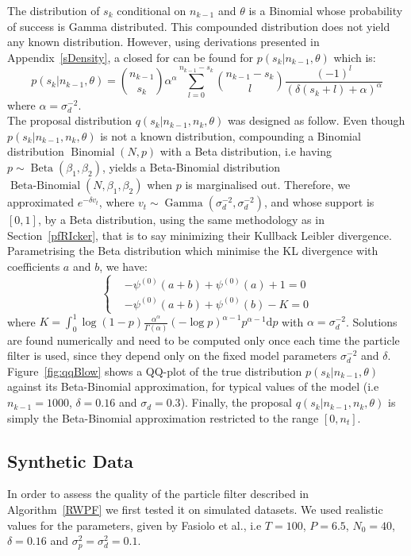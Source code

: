 \documentclass[12pt]{article}
\begin{document}
	The distribution of $s_k$ conditional on $n_{k-1}$ and $\theta$ is a Binomial whose probability of success is Gamma distributed. This compounded distribution does not yield any known distribution. However, using derivations presented in Appendix~\ref{sDensity}, a closed for can be found for $p(s_k|n_{k-1}, \theta)$ which is:
	\begin{equation*}
	p(s_k|n_{k-1}, \theta) = \binom{n_{k-1}}{s_k}\alpha^\alpha\sum_{l=0}^{n_{k-1}-s_k}\binom{n_{k-1}-s_k}{l}\frac{(-1)^l}{(\delta(s_k+l)+\alpha)^\alpha}
	\end{equation*}
	where $\alpha = \sigma_d^{-2}$. \\
	
	The proposal distribution $q(s_k|n_{k-1}, n_k, \theta)$ was designed as follow. Even though $p(s_k|n_{k-1}, n_k, \theta)$ is not a known distribution, compounding a Binomial distribution $\operatorname{Binomial}(N, p)$ with a Beta distribution, i.e having $p \sim \operatorname{Beta}(\beta_1,  \beta_2)$, yields a Beta-Binomial distribution $\operatorname{Beta-Binomial}(N, \beta_1, \beta_2)$ when $p$ is marginalised out. Therefore, we approximated $e^{-\delta v_t}$, where $v_t \sim \operatorname{Gamma}(\sigma_d^{-2}, \sigma_d^{-2})$, and whose support is $[0, 1]$, by a Beta distribution, using the same methodology as in Section~\ref{pfRIcker}, that is to say minimizing their Kullback Leibler divergence. Parametrising the Beta distribution which minimise the KL divergence with coefficients $a$ and $b$, we have:
	\[	\begin{cases}
	& -\psi^{(0)}(a+b) + \psi^{(0)}(a) + 1 = 0 \\
	& -\psi^{(0)}(a+b) + \psi^{(0)}(b) - K  = 0
	\end{cases}\]
	where $K=\int_{0}^{1}\log(1-p)\frac{\alpha^\alpha}{\Gamma(\alpha)}(-\log p)^{\alpha-1}p^{\alpha-1}\mathrm{d}p$ with $\alpha = \sigma_d^{-2}$. Solutions are found numerically and need to be computed only once each time the particle filter is used, since they depend only on the fixed model parameters $\sigma_d^{-2}$ and $\delta$. Figure~\ref{fig:qqBlow} shows a QQ-plot of the true distribution $p(s_k|n_{k-1}, \theta)$ against its Beta-Binomial approximation, for typical values of the model (i.e $n_{k-1} = 1000$, $\delta=0.16$ and $\sigma_d=0.3$). Finally, the proposal $q(s_k|n_{k-1}, n_k, \theta)$ is simply the Beta-Binomial approximation restricted to the range $[0, n_t]$.
	
	\subsection{Synthetic Data}
	In order to assess the quality of the particle filter described in Algorithm~\ref{RWPF} we first tested it on simulated datasets. We used realistic values for the parameters, given by Fasiolo et al.\cite{fasiolo2014statistical}, i.e $T=100$, $P=6.5$, $N_0=40$, $\delta=0.16$ and $\sigma_p^2=\sigma_d^2=0.1$.
	
\end{document}
